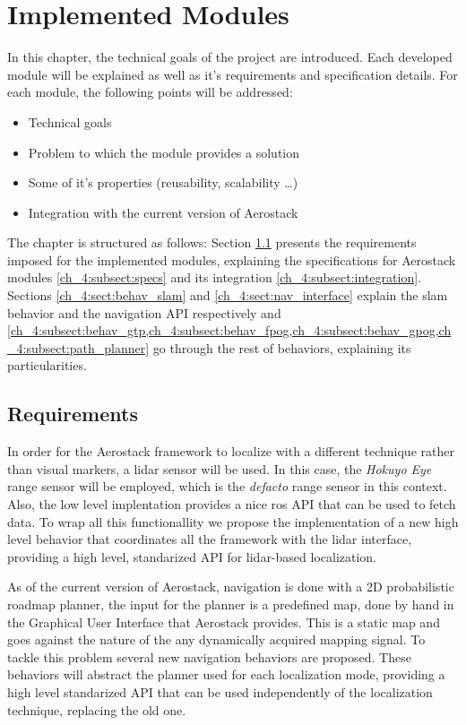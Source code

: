 \chapter{Implemented Modules} \label{ch_4:chapter}

In this chapter, the technical goals of the project are introduced. Each developed module will be explained as well as it's requirements and specification details. For each module, the following points will be addressed:

\begin{itemize}
  \item Technical goals
  \item Problem to which the module provides a solution
  \item Some of it's properties (reusability, scalability \dots)
  \item Integration with the current version of Aerostack
\end{itemize}

The chapter is structured as follows: Section \ref{ch_4:sect:requirements} presents the requirements imposed for the implemented modules, explaining the specifications for Aerostack modules \ref{ch_4:subsect:specs} and its integration \ref{ch_4:subsect:integration}. Sections \ref{ch_4:sect:behav_slam} and \ref{ch_4:sect:nav_interface} explain the slam behavior and the navigation API respectively and \cref{ch_4:subsect:behav_gtp,ch_4:subsect:behav_fpog,ch_4:subsect:behav_gpog,ch_4:subsect:path_planner} go through the rest of behaviors, explaining its particularities.

\section{Requirements} \label{ch_4:sect:requirements}

  In order for the Aerostack framework to localize with a different technique rather than visual markers, a lidar sensor will be used. In this case, the \textit{Hokuyo Eye} range sensor will be employed, which is the \textit{defacto} range sensor in this context. Also, the low level implentation provides a nice ros API that can be used to fetch data. To wrap all this functionallity we propose the implementation of a new high level behavior that coordinates all the framework with the lidar interface, providing a high level, standarized API for lidar-based localization.

  As of the current version of Aerostack, navigation is done with a 2D probabilistic roadmap planner, the input for the planner is a predefined map, done by hand in the Graphical User Interface that Aerostack provides. This is a static map and goes against the nature of the any dynamically acquired mapping signal. To tackle this problem several new navigation behaviors are proposed. These behaviors will abstract the planner used for each localization mode, providing a high level standarized API that can be used independently of the localization technique, replacing the old one.

